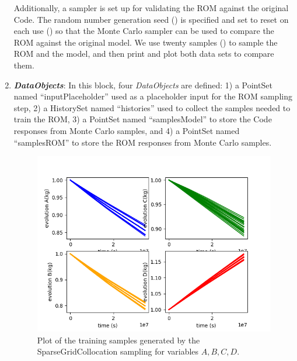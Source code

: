 \begin{enumerate}
  Additionally, a  sampler is set up for validating the ROM against the original Code.  The random
  number generation seed () is specified and set to reset on each use
  () so that the Monte Carlo sampler can be used to compare the ROM against the
  original model.  We use twenty samples () to sample the ROM and the model, and then print and
  plot both data sets to compare them.
   \item \textbf{\textit{DataObjects}}:
  In this block, four \textit{DataObjects} are defined:
  1) a PointSet named ``inputPlaceholder'' used as a placeholder input for the ROM sampling step,
  2) a HistorySet named ``histories'' used to collect the samples needed to train the ROM,
  3) a PointSet named ``samplesModel'' to store the Code responses from Monte Carlo samples, and
  4) a PointSet named ``samplesROM'' to store the ROM responses from Monte Carlo samples.
 \begin{figure}[h!]
  \centering
  \includegraphics[scale=0.7]{../../tests/framework/user_guide/ForwardSamplingStrategies/gold/RunDir/SparseGrid/1-historyPlot_line-line-line-line.png}
  \caption{Plot of the training samples generated by the SparseGridCollocation sampling for variables $A,B,C,D$.}
  \label{fig:historiesSparseGridPlotLine}
 \end{figure}

\end{enumerate}
